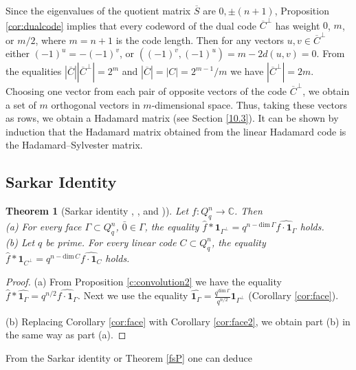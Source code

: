 \documentclass[11pt]{article}
\newtheorem{theorem}{Theorem}[section]
\theoremstyle{definition}
\begin{document}
{{{Since the eigenvalues of the quotient matrix $\overline{S}$ are $0,\pm
(n+1)$,  Proposition \ref{cor:dualcode}  implies that every codeword of the dual code $\overline{C}^\perp$ has weight $0$, $m$, or $m/2$, where $m=n+1$ is the code length. Then for any vectors $u,v\in \overline{C}^\perp$ either $(-1)^u=-(-1)^v$, or $((-1)^v,(-1)^u)=m-2d(u,v)=0$. From the equalities $|\overline{C}||\overline{C}^\perp|=2^m$ and $|\overline{C}|=|C|=2^{m-1}/m$ we have $|\overline{C}^\perp|=2m$. Choosing one vector from each pair of opposite vectors of the code $\overline{C}^\perp$, we obtain a set of $m$ orthogonal vectors in $m$-dimensional space.   Thus, taking these vectors as  rows,  we obtain a Hadamard matrix  (see Section \ref{10.3}). It can be shown by induction that the Hadamard matrix obtained from the linear Hadamard code is the Hadamard--Sylvester matrix.








\subsection{Sarkar Identity}


\begin{theorem}[Sarkar identity \cite{Sar}, \cite{VNTs}, and \cite{MacW})]\label{th:sarkar}
Let $f:Q^n_q\rightarrow \mathbb{C}$. Then\\
 (a)  For every face $\Gamma\subset Q^n_q$, $\bar{0}\in \Gamma$, the equality
$\widehat{f}*{\mathbf 1}_{\Gamma^\perp}=q^{n-\mathrm{dim}\,\Gamma}\widehat{f\cdot{\mathbf 1}_\Gamma}$ holds.\\
(b) Let $q$ be prime.  For every linear code $C \subset Q^n_q$,  the equality
$\widehat{f}*{\mathbf 1}_{C^\perp}=q^{n-\mathrm{dim}\,C}\widehat{f\cdot {\mathbf 1}_{C}}$ holds.
\end{theorem}
\begin{proof}
(a)   From Proposition \ref{c:convolution2} we have the equality
$\widehat{f}*\widehat{{\mathbf 1}_{\Gamma}}=q^{n/2}\widehat{f\cdot {\mathbf 1}_{\Gamma}}$.
Next we use the equality
$\widehat{{\mathbf 1}_{\Gamma}}=\frac{q^{\mathrm{dim}\,\Gamma}}{q^{n/2}}{\mathbf 1}_{\Gamma^\perp}$
(Corollary \ref{cor:face}).

(b)  Replacing Corollary \ref{cor:face} with Corollary \ref{cor:face2}, we obtain part (b) in the same way as part (a).
\end{proof}



From the Sarkar identity or Theorem \ref{fsP} one can deduce




}}}
\end{document}
